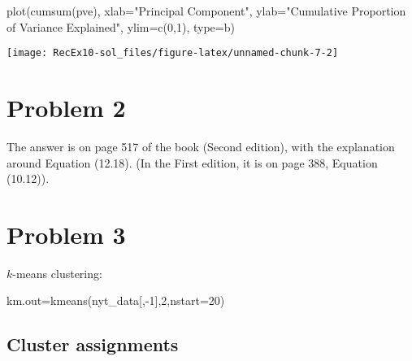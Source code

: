 \documentclass[
]{article}
\newenvironment{Shaded}{\begin{snugshade}}{\end{snugshade}}
\newcommand{\AttributeTok}[1]{\textcolor[rgb]{0.77,0.63,0.00}{#1}}
\newcommand{\DecValTok}[1]{\textcolor[rgb]{0.00,0.00,0.81}{#1}}
\newcommand{\FunctionTok}[1]{\textcolor[rgb]{0.00,0.00,0.00}{#1}}
\newcommand{\NormalTok}[1]{#1}
\newcommand{\OtherTok}[1]{\textcolor[rgb]{0.56,0.35,0.01}{#1}}
\newcommand{\SpecialCharTok}[1]{\textcolor[rgb]{0.00,0.00,0.00}{#1}}
\newcommand{\StringTok}[1]{\textcolor[rgb]{0.31,0.60,0.02}{#1}}
\begin{document}
\begin{Shaded}
\begin{Highlighting}[]
\FunctionTok{plot}\NormalTok{(}\FunctionTok{cumsum}\NormalTok{(pve), }
     \AttributeTok{xlab=}\StringTok{"Principal Component"}\NormalTok{, }
     \AttributeTok{ylab=}\StringTok{"Cumulative Proportion of Variance Explained"}\NormalTok{, }
     \AttributeTok{ylim=}\FunctionTok{c}\NormalTok{(}\DecValTok{0}\NormalTok{,}\DecValTok{1}\NormalTok{),}
     \AttributeTok{type=}\StringTok{\textquotesingle{}b\textquotesingle{}}\NormalTok{)}
\end{Highlighting}
\end{Shaded}

\begin{center}\texttt{[image: RecEx10-sol\_files/figure-latex/unnamed-chunk-7-2]} \end{center}

\hypertarget{problem-2}{%
\section{Problem 2}\label{problem-2}}

The answer is on page 517 of the book (Second edition), with the
explanation around Equation (12.18). (In the First edition, it is on
page 388, Equation (10.12)).

\hypertarget{problem-3}{%
\section{Problem 3}\label{problem-3}}

\(k\)-means clustering:

\begin{Shaded}
\begin{Highlighting}[]
\NormalTok{km.out}\OtherTok{=}\FunctionTok{kmeans}\NormalTok{(nyt\_data[,}\SpecialCharTok{{-}}\DecValTok{1}\NormalTok{],}\DecValTok{2}\NormalTok{,}\AttributeTok{nstart=}\DecValTok{20}\NormalTok{)}
\end{Highlighting}
\end{Shaded}

\hypertarget{cluster-assignments}{%
\subsection{Cluster assignments}\label{cluster-assignments}}

\begin{Shaded}
\end{Shaded}
\end{document}

